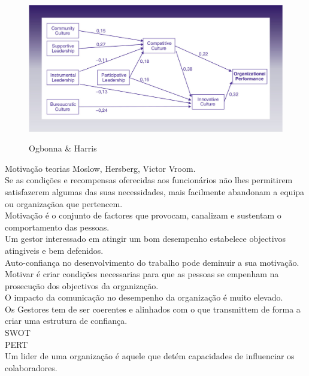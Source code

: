 \begin{figure}[H]
\centering
\includegraphics[scale=.3]{"./image/OB/Ogbonna & Harris.jpg"}\\
\caption{Ogbonna \& Harris}
\label{grafico 1}
\end{figure}\par



Motivação teorias Moslow, Hersberg, Victor Vroom.\\
Se as condições e recompensas oferecidas aos funcionários não lhes permitirem satisfazerem algumas das suas necessidades, mais facilmente abandonam a equipa ou organizaçãoa que pertencem.\\
Motivação é o conjunto de factores que provocam, canalizam e sustentam o comportamento das pessoas.\\

Um gestor interessado em atingir um bom desempenho estabelece objectivos atingiveis e bem defenidos.\\
Auto-confiança no desenvolvimento do trabalho pode deminuir a sua motivação.\\
Motivar é criar condições necessarias para que as pessoas se empenham na prosecução dos objectivos da organização.\\

O impacto da comunicação no desempenho da organização é muito elevado.\\
Os Gestores tem de ser coerentes e alinhados com o que transmittem de forma a criar uma estrutura de confiança.\\

SWOT\\
PERT\\

Um lider de uma organização é aquele que detém capacidades de influenciar os colaboradores.\\

